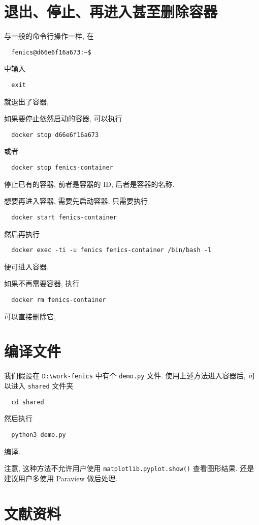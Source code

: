 \documentclass[fontset=founder]{ctexrep}
\begin{document}
\section{退出、停止、再进入甚至删除容器}\label{sec:handle-containder}

与一般的命令行操作一样,
在
\begin{lstlisting}
  fenics@d66e6f16a673:~$
\end{lstlisting}
中输入
\begin{lstlisting}
  exit
\end{lstlisting}
就退出了容器,

如果要停止依然启动的容器,
可以执行
\begin{lstlisting}
  docker stop d66e6f16a673
\end{lstlisting}
或者
\begin{lstlisting}
  docker stop fenics-container
\end{lstlisting}
停止已有的容器,
前者是容器的 ID,
后者是容器的名称.

想要再进入容器,
需要先启动容器,
只需要执行
\begin{lstlisting}
  docker start fenics-container
\end{lstlisting}
然后再执行
\begin{lstlisting}
  docker exec -ti -u fenics fenics-container /bin/bash -l
\end{lstlisting}
便可进入容器.

如果不再需要容器,
执行
\begin{lstlisting}
  docker rm fenics-container
\end{lstlisting}
可以直接删除它,

\section{编译文件}

我们假设在 \texttt{D:\textbackslash work-fenics} 中有个 \texttt{demo.py} 文件.
使用上述方法进入容器后,
可以进入 \texttt{shared} 文件夹
\begin{lstlisting}
  cd shared
\end{lstlisting}
然后执行
\begin{lstlisting}
  python3 demo.py
\end{lstlisting}
编译.

注意,
这种方法不允许用户使用 \texttt{matplotlib.pyplot.show()} 查看图形结果.
还是建议用户多使用 \href{https://www.paraview.org/}{Paraview} 做后处理.

\section{文献资料}
\end{document}
